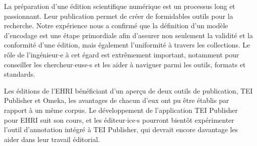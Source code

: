 
La préparation d'une édition scientifique numérique est un processus long et passionnant. Leur publication permet de créer de formidables outils pour la recherche. Notre expérience nous a confirmé que la définition d'un modèle d'encodage est une étape primordiale afin d'assurer non seulement la validité et la conformité d'une édition, mais également l'uniformité à travers les collections. Le rôle de l'ingénieur$\cdot$e à cet égard est extrêmement important, notamment pour conseiller les chercheur$\cdot$euse$\cdot$s et les aider à naviguer parmi les outils, formats et standards.  

Les éditions de l'EHRI bénéficiant d'un aperçu de deux outils de publication, TEI Publisher et Omeka, les avantages de chacun d'eux ont pu être établis par rapport à un même corpus. Le développement de l'application TEI Publisher pour EHRI suit son cours, et les éditeur$\cdot$ice$\cdot$s pourront bientôt expérimenter l'outil d'annotation intégré à TEI Publisher, qui devrait encore davantage les aider dans leur travail éditorial.